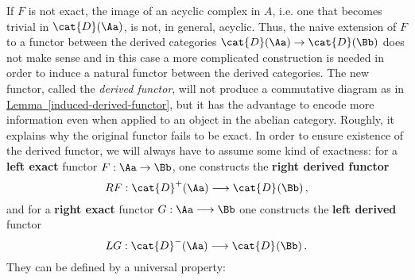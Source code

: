 If $F$ is not exact, the image of an acyclic complex in $A$, 
i.e. one that becomes trivial in $\cat{D}(\Aa)$, is not, 
in general, acyclic. Thus, the naive extension of $F$ 
to a functor between the derived categories 
$\cat{D}(\Aa) \to \cat{D}(\Bb)$ does not make sense
and in this case a more complicated construction is needed 
in order to induce a natural functor between the derived categories. 
The new functor, called the \emph{derived functor}, 
will not produce a commutative diagram 
as in \hyperref[induced-derived-functor]{Lemma~\ref*{induced-derived-functor}}, 
but it has the advantage to encode more information 
even when applied to an object in the abelian category. 
Roughly, it explains why the original functor fails to be exact.
In order to ensure existence of the derived functor, 
we will always have to assume some kind of exactness:
for a \textbf{left exact} functor $F : \Aa \to \Bb$,
one constructs the \textbf{right derived functor}
\begin{equation*}
    RF : \cat{D}^{+}(\Aa) \longrightarrow \cat{D}^{}(\Bb)\,,
\end{equation*}
and for a \textbf{right exact} functor $G:\Aa \longrightarrow \Bb$
one constructs the \textbf{left derived} functor
\begin{equation*}
    LG : \cat{D}^{-}(\Aa) \longrightarrow \cat{D}^{}(\Bb)\,.
\end{equation*}
They can be defined by a universal property:

